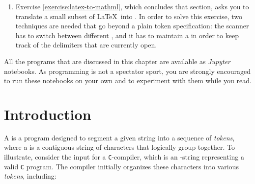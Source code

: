 \begin{enumerate}
      \emph{not} solved by building a scanner.  Instead, the input is pushed through a , which is built with the function \texttt{re.sub}.  This
      section also shows the limits of our approach: we will see in Chapter \ref{chapter:regular-languages} why
      no regular expression is able to describe the syntax of .
\item Exercise \ref{exercise:latex-to-mathml}, which concludes that section, asks you to translate a small
      subset of \LaTeX\ into .  In order to solve this exercise, two techniques are needed that
      go beyond a plain token specification: the scanner has to switch between different , and it has to maintain a  in order to keep track of
      the delimiters that are currently open.
\end{enumerate}
All the programs that are discussed in this chapter are available as \textsl{Jupyter} notebooks.  As programming
is not a spectator sport, you are strongly encouraged to run these notebooks on your own and to experiment with
them while you read.

\section{Introduction \label{section:scanner-introduction}}
A  is a program designed to segment a given string into a sequence of
\emph{tokens}, where a  is a contiguous string of characters that logically group
together. To illustrate, consider the input for a \texttt{C}-compiler, which is an -string
representing a valid \texttt{C} program. The compiler initially organizes these characters into various
\emph{tokens}, including:  

